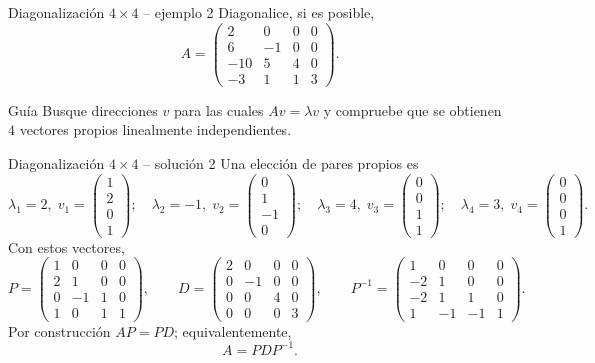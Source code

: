 \documentclass[aspectratio=169,10pt]{beamer}
\begin{document}
\begin{frame}{Diagonalización $4\times 4$ -- ejemplo 2}
\small
Diagonalice, si es posible,
\[
A=\begin{pmatrix}2 & 0 & 0 & 0\\6 & -1 & 0 & 0\\-10 & 5 & 4 & 0\\-3 & 1 & 1 & 3\end{pmatrix}.
\]
\begin{block}{Guía}
Busque direcciones $v$ para las cuales $Av=\lambda v$ y compruebe que se obtienen $4$ vectores propios linealmente independientes.
\end{block}
\end{frame}
\begin{frame}{Diagonalización $4\times 4$ -- solución 2}
\scriptsize
Una elección de pares propios es
\[
\lambda_1=2,\;v_1=\begin{pmatrix}1\\2\\0\\1\end{pmatrix};\quad \lambda_2=-1,\;v_2=\begin{pmatrix}0\\1\\-1\\0\end{pmatrix};\quad \lambda_3=4,\;v_3=\begin{pmatrix}0\\0\\1\\1\end{pmatrix};\quad \lambda_4=3,\;v_4=\begin{pmatrix}0\\0\\0\\1\end{pmatrix}.
\]
Con estos vectores,
\[
P=\begin{pmatrix}1 & 0 & 0 & 0\\2 & 1 & 0 & 0\\0 & -1 & 1 & 0\\1 & 0 & 1 & 1\end{pmatrix},\qquad D=\begin{pmatrix}2 & 0 & 0 & 0\\0 & -1 & 0 & 0\\0 & 0 & 4 & 0\\0 & 0 & 0 & 3\end{pmatrix},\qquad P^{-1}=\begin{pmatrix}1 & 0 & 0 & 0\\-2 & 1 & 0 & 0\\-2 & 1 & 1 & 0\\1 & -1 & -1 & 1\end{pmatrix}.
\]
Por construcción $AP=PD$; equivalentemente,
\[
\boxed{A=PDP^{-1}}.
\]
\end{frame}
\end{document}
